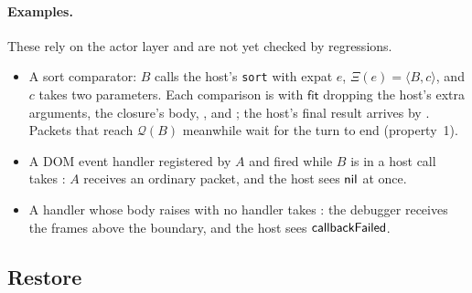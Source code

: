 \paragraph{Examples.}
These rely on the actor layer and are not yet checked by regressions.
\begin{itemize}
\item A sort comparator: $B$ calls the host's \texttt{sort} with expat $e$,
      $\Xi(e)=\langle B,c\rangle$, and $c$ takes two parameters.  Each
      comparison is  with $\mathsf{fit}$ dropping
      the host's extra arguments, the closure's body, ,
      and ; the host's final result arrives by
      .  Packets that reach $\mathcal Q(B)$ meanwhile
      wait for the turn to end (property~1).
\item A DOM event handler registered by $A$ and fired while $B$ is in a host
      call takes : $A$ receives an ordinary packet,
      and the host sees $\mathsf{nil}$ at once.
\item A handler whose body raises with no handler takes
      : the debugger receives the frames above the
      boundary, and the host sees $\mathsf{callbackFailed}$.
\end{itemize}

\subsection{Restore}

